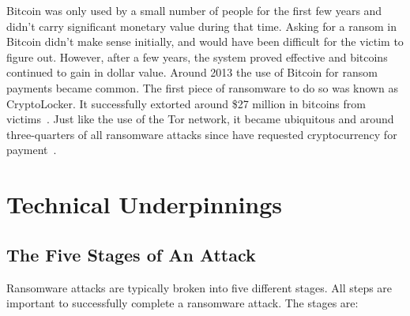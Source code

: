 \documentclass{IEEEtran}
\begin{document}
Bitcoin was only used by a small number of people for the first few years and didn't carry significant monetary value during that time. Asking for a ransom in Bitcoin didn't make sense initially, and would have been difficult for the victim to figure out. However, after a few years, the system proved effective and bitcoins continued to gain in dollar value. Around 2013 the use of Bitcoin for ransom payments became common. The first piece of ransomware to do so was known as CryptoLocker. It successfully extorted around \$27 million in bitcoins from victims~\cite{RN34}. Just like the use of the Tor network, it became ubiquitous and around three-quarters of all ransomware attacks since have requested cryptocurrency for payment~\cite{RN33}.


\section{Technical Underpinnings}\label{techund}

\subsection{The Five Stages of An Attack}\label{overview}
Ransomware attacks are typically broken into five different stages. All steps are important to successfully complete a ransomware attack. The stages are:
\hfill \break
\end{document}
